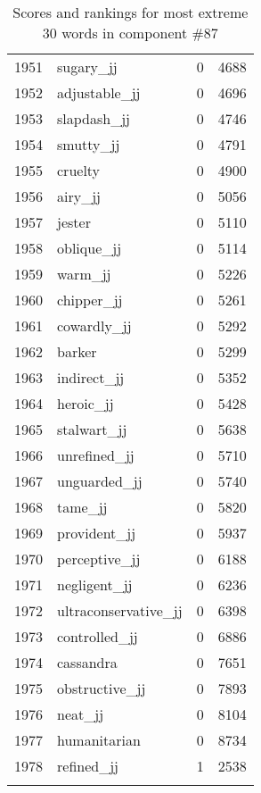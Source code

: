 \begin{longtable}[!htbp]{| rlr@{.}l |}
    1951 & sugary\_jj & 0 & 4688 \\
    1952 & adjustable\_jj & 0 & 4696 \\
    1953 & slapdash\_jj & 0 & 4746 \\
    1954 & smutty\_jj & 0 & 4791 \\
    1955 & cruelty & 0 & 4900 \\
    1956 & airy\_jj & 0 & 5056 \\
    1957 & jester & 0 & 5110 \\
    1958 & oblique\_jj & 0 & 5114 \\
    1959 & warm\_jj & 0 & 5226 \\
    1960 & chipper\_jj & 0 & 5261 \\
    1961 & cowardly\_jj & 0 & 5292 \\
    1962 & barker & 0 & 5299 \\
    1963 & indirect\_jj & 0 & 5352 \\
    1964 & heroic\_jj & 0 & 5428 \\
    1965 & stalwart\_jj & 0 & 5638 \\
    1966 & unrefined\_jj & 0 & 5710 \\
    1967 & unguarded\_jj & 0 & 5740 \\
    1968 & tame\_jj & 0 & 5820 \\
    1969 & provident\_jj & 0 & 5937 \\
    1970 & perceptive\_jj & 0 & 6188 \\
    1971 & negligent\_jj & 0 & 6236 \\
    1972 & ultraconservative\_jj & 0 & 6398 \\
    1973 & controlled\_jj & 0 & 6886 \\
    1974 & cassandra & 0 & 7651 \\
    1975 & obstructive\_jj & 0 & 7893 \\
    1976 & neat\_jj & 0 & 8104 \\
    1977 & humanitarian & 0 & 8734 \\
    1978 & refined\_jj & 1 & 2538 \\
    \hline
    \caption{Scores and rankings for most extreme 30 words in component \#87} \\
\end{longtable}
